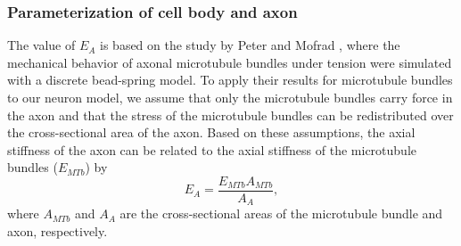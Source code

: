 \documentclass[10pt]{asme2ej}
\begin{document}
\subsubsection{Parameterization of cell body and axon}
The value of $E_A$ is based on the study by Peter and Mofrad \cite{Peter:2012fc}, where the mechanical behavior of axonal microtubule bundles under tension were simulated with a discrete bead-spring model. To apply their results for microtubule bundles to our neuron model, we assume that only the microtubule bundles carry force in the axon and that the stress of the microtubule bundles can be redistributed over the cross-sectional area of the axon. Based on these assumptions, the axial stiffness of the axon can be related to the axial stiffness of the microtubule bundles ($E_{MTb}$) by
%
\begin{equation}
E_A = \frac{E_{MTb} A_{MTb}}{A_A},
\label{eq:EA_EMTb_relation}
\end{equation}
%
where $A_{MTb}$ and $A_A$ are the cross-sectional areas of the microtubule bundle and axon, respectively. 
\end{document}
